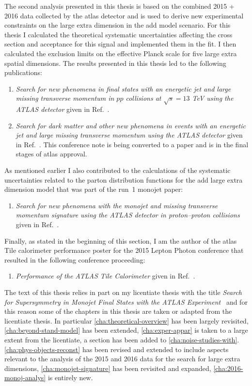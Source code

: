 The second analysis presented in this thesis is based on the combined 2015 +
2016 data collected by the \gls{atlas} detector and is used to derive new
experimental constraints on the large extra dimension in the \gls{add} model
scenario. For this thesis I calculated the theoretical systematic uncertainties
affecting the cross section and acceptance for this signal and implemented them
in the fit. I then calculated the exclusion limits on the effective Planck scale
for five large extra spatial dimensions. The results presented in this thesis
led to the following publications:
\begin{enumerate}[A -]
\item \emph{{Search for new phenomena in final states with an energetic jet and
      large missing transverse momentum in $pp$ collisions at $\sqrt{s} = 13$
      TeV using the ATLAS detector}} given in Ref.~\cite{MonoJetPaper}.
\item \emph{{Search for dark matter and other new phenomena in events with an
      energetic jet and large missing transverse momentum using the ATLAS
      detector}} given in Ref.~\cite{MonoJetPaper2016}. This conference note is
  being converted to a paper and is in the final stages of \gls{atlas} approval.
\end{enumerate}
As mentioned earlier I also contributed to the calculations of the systematic
uncertainties related to the parton distribution functions for the \gls{add}
large extra dimension model that was part of the run~1 monojet paper:
\begin{enumerate}[C -]
\item \emph{Search for new phenomena with the monojet and missing transverse
    momentum signature using the ATLAS detector in proton–proton
    collisions} given in Ref.~\cite{RunIPaper}.
\end{enumerate}
Finally, as stated in the beginning of this section, I am the author of the
\gls{atlas} Tile calorimeter performance poster for the 2015 Lepton Photon
conference that resulted in the following conference proceeding:
\begin{enumerate}[D -]
\item \emph{{Performance of the ATLAS Tile Calorimeter}} given in
  Ref.~\cite{TileCalPerformanceBertoli}.
\end{enumerate}

The text of this thesis relies in part on my licentiate thesis with the title
\emph{Search for Supersymmetry in Monojet Final States with the ATLAS
  Experiment}~\cite{MyLicentiate} and for this reason some of the chapters in
this thesis are taken or adapted from the licentiate thesis. In particular
\cref{cha:theoretical-overview} has been largely revisited,
\cref{cha:beyond-stand-model} has been extended, \cref{cha:exper-appar} is taken
to a large extent from the licentiate, a section has been added to
\cref{cha:noise-studies-with}. \cref{cha:phys-objects-reconst} has been revised
and extended to include aspects relevant to the analysis of the 2015 and 2016
data for the search for large extra dimensions, \cref{cha:monojet-signature} has
been revisited and expanded, \cref{cha:2016-monoj-analys} is entirely new.
